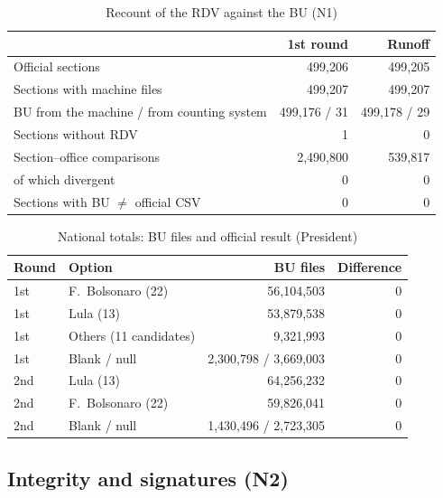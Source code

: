 \begin{table}[ht]
\caption{Recount of the RDV against the BU (N1)}
\label{tab:n1}
\centering\scriptsize
\begin{tabular}{@{}l r r@{}}
\toprule
 & \textbf{1st round} & \textbf{Runoff} \\
\midrule
Official sections & 499,206 & 499,205 \\
Sections with machine files & 499,207 & 499,207 \\
BU from the machine / from counting system & 499,176 / 31 & 499,178 / 29 \\
Sections without RDV & 1 & 0 \\
Section--office comparisons & 2,490,800 & 539,817 \\
\quad of which divergent & 0 & 0 \\
Sections with BU $\neq$ official CSV & 0 & 0 \\
\bottomrule
\end{tabular}
\end{table}

\begin{table}[ht]
\caption{National totals: BU files and official result (President)}
\label{tab:n1tot}
\centering\scriptsize
\begin{tabular}{@{}l l r r@{}}
\toprule
\textbf{Round} & \textbf{Option} & \textbf{BU files} & \textbf{Difference} \\
\midrule
1st & F.\ Bolsonaro (22) & 56,104,503 & 0 \\
1st & Lula (13) & 53,879,538 & 0 \\
1st & Others (11 candidates) & 9,321,993 & 0 \\
1st & Blank / null & 2,300,798 / 3,669,003 & 0 \\
2nd & Lula (13) & 64,256,232 & 0 \\
2nd & F.\ Bolsonaro (22) & 59,826,041 & 0 \\
2nd & Blank / null & 1,430,496 / 2,723,305 & 0 \\
\bottomrule
\end{tabular}
\end{table}

\subsection{Integrity and signatures (N2)}

